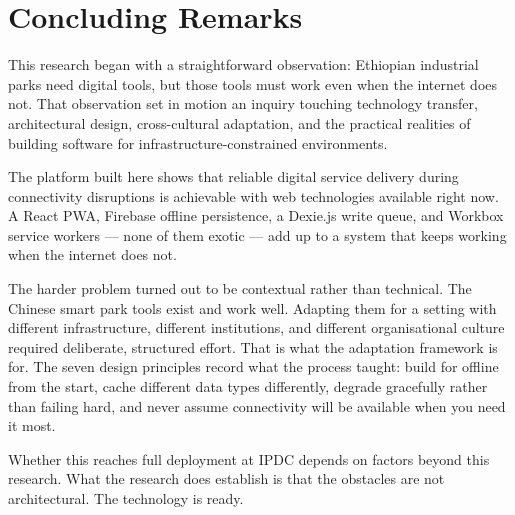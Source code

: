 \section{Concluding Remarks}

This research began with a straightforward observation: Ethiopian industrial parks need digital tools, but those tools must work even when the internet does not. That observation set in motion an inquiry touching technology transfer, architectural design, cross-cultural adaptation, and the practical realities of building software for infrastructure-constrained environments.

The platform built here shows that reliable digital service delivery during connectivity disruptions is achievable with web technologies available right now. A React PWA, Firebase offline persistence, a Dexie.js write queue, and Workbox service workers --- none of them exotic --- add up to a system that keeps working when the internet does not.

The harder problem turned out to be contextual rather than technical. The Chinese smart park tools exist and work well. Adapting them for a setting with different infrastructure, different institutions, and different organisational culture required deliberate, structured effort. That is what the adaptation framework is for. The seven design principles record what the process taught: build for offline from the start, cache different data types differently, degrade gracefully rather than failing hard, and never assume connectivity will be available when you need it most.

Whether this reaches full deployment at IPDC depends on factors beyond this research. What the research does establish is that the obstacles are not architectural. The technology is ready.
